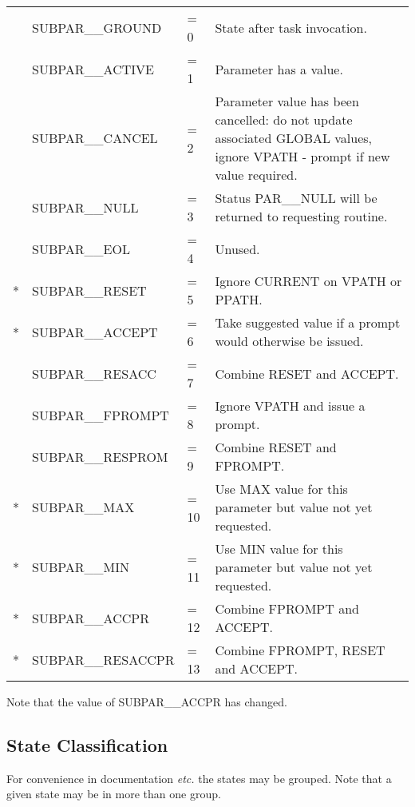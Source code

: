 \begin{tabular}{cllp{3.5in}}
& SUBPAR\_\_GROUND &= 0  &State after task invocation.\\
& SUBPAR\_\_ACTIVE &= 1  &Parameter has a value.\\
& SUBPAR\_\_CANCEL &= 2  &Parameter value has been cancelled:
do not update associated GLOBAL values,
ignore VPATH - prompt if new value required.\\
& SUBPAR\_\_NULL   &= 3  &Status PAR\_\_NULL will be returned to requesting
routine.\\
& SUBPAR\_\_EOL    &= 4  &Unused.\\
{*} &SUBPAR\_\_RESET  &= 5  &Ignore CURRENT on VPATH or PPATH.\\
{*} &SUBPAR\_\_ACCEPT &= 6  &Take suggested value if a prompt would otherwise
be issued.\\
& SUBPAR\_\_RESACC &= 7  &Combine RESET and ACCEPT.\\
& SUBPAR\_\_FPROMPT &= 8 &Ignore VPATH and issue a prompt.\\
& SUBPAR\_\_RESPROM &= 9 & Combine RESET and FPROMPT.\\
{*} &SUBPAR\_\_MAX    &= 10 &Use MAX value for this parameter but value not
yet requested.\\
{*} &SUBPAR\_\_MIN    &= 11  & Use MIN value for this parameter but value
not yet requested.\\
{*} &SUBPAR\_\_ACCPR  &= 12  &Combine FPROMPT and ACCEPT.\\
{*} &SUBPAR\_\_RESACCPR &= 13  &Combine FPROMPT, RESET and ACCEPT.\\
\end{tabular}

Note that the value of SUBPAR\_\_ACCPR has changed.


\subsection{State Classification}
For convenience in documentation {\em etc.} the states may be grouped.
Note that a given state may be in more than one group.

